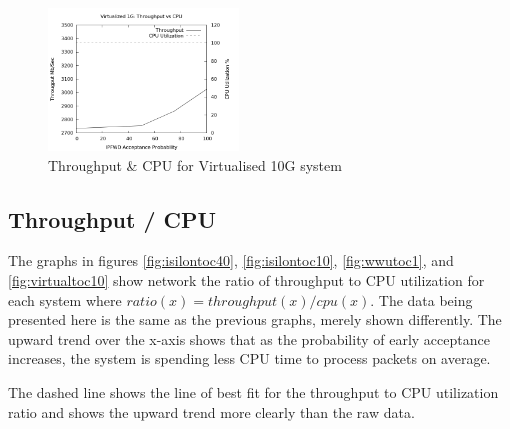 \documentclass[journal]{IEEEtran}
\begin{document}
    \begin{figure}[h]
      \includegraphics[width=0.45\textwidth]{cpu_virtual10}
      \caption{Throughput \& CPU for Virtualised 10G system}
      \label{fig:virtualcpu10}
    \end{figure}
    
  \subsection{Throughput / CPU}

    The graphs in figures \ref{fig:isilontoc40}, \ref{fig:isilontoc10},
    \ref{fig:wwutoc1}, and \ref{fig:virtualtoc10}  show network the ratio of
    throughput to CPU utilization for each system where $ratio(x) =
    throughput(x) / cpu(x)$. The data being presented here is the same as the
    previous graphs, merely shown differently. The upward trend over the x-axis
    shows that as the probability of early acceptance increases, the system is
    spending less CPU time to process packets on average.

    The dashed line shows the line of best fit for the throughput to CPU
    utilization ratio and shows the upward trend more clearly than the raw
    data.
    
\end{document}
